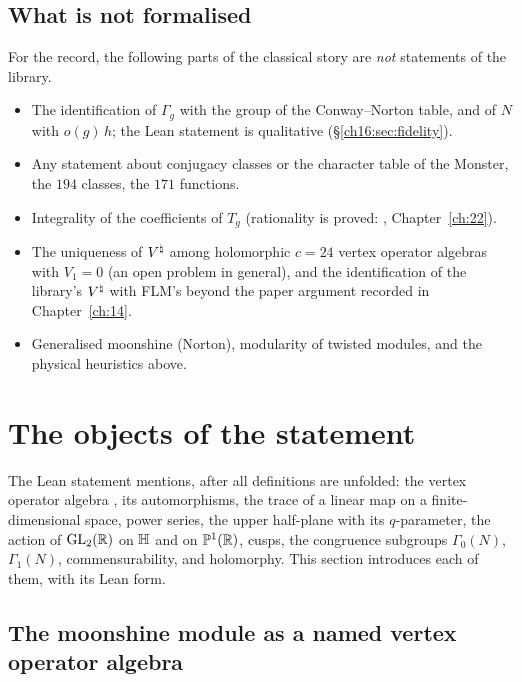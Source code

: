 \subsection{What is not formalised}

For the record, the following parts of the classical story are \emph{not} statements of the library.
\begin{itemize}
\item The identification of $\Gamma_g$ with the group of the Conway--Norton table, and of $N$ with $o(g)\,h$; the Lean
  statement is qualitative (\S\ref{ch16:sec:fidelity}).
\item Any statement about conjugacy classes or the character table of the Monster, the $194$ classes, the $171$
  functions.
\item Integrality of the coefficients of $T_g$ (rationality is proved: , Chapter~\ref{ch:22}).
\item The uniqueness of ${V^{\natural}}$ among holomorphic $c=24$ vertex operator algebras with $V_1=0$ (an open problem in
  general), and the identification of the library's ${V^{\natural}}$ with FLM's beyond the paper argument recorded in
  Chapter~\ref{ch:14}.
\item Generalised moonshine (Norton), modularity of twisted modules, and the physical heuristics above.
\end{itemize}


\section{The objects of the statement}\label{ch16:sec:objects}

The Lean statement  mentions, after all definitions are unfolded: the vertex operator
algebra , its automorphisms, the trace of a linear map on a finite-dimensional space, power series, the
upper half-plane with its $q$-parameter, the action of $\mathrm{GL}_2(\mathbb{R})$ on $\mathbb{H}$ and on $\mathbb{P}^1(\mathbb{R})$,
cusps, the congruence subgroups $\Gamma_0(N)$, $\Gamma_1(N)$, commensurability, and holomorphy.  This section
introduces each of them, with its Lean form.

\subsection{The moonshine module as a named vertex operator algebra}


